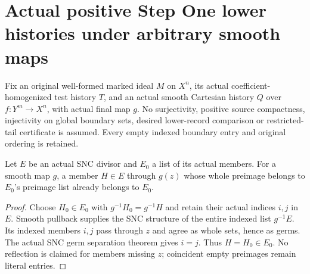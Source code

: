 \section{Actual positive Step One lower histories under arbitrary smooth maps}

Fix an original well-formed marked ideal $M$ on $X^n$, its actual
coefficient-homogenized test history $T$, and an actual smooth Cartesian
history $Q$ over $f:Y^m\to X^n$, with actual final map $g$.
No surjectivity, positive source compactness, injectivity on global boundary
sets, desired lower-record comparison or restricted-tail certificate is
assumed. Every empty indexed boundary entry and original ordering is retained.

\begin{lemma}
\label{hir:smooth-positive-lower-through-member-reflection}
\leanok
{}
Let $E$ be an actual SNC divisor and $E_0$ a list of its actual members.
For a smooth map $g$, a member $H\in E$ through $g(z)$ whose whole preimage
belongs to $E_0$'s preimage list already belongs to $E_0$.
\end{lemma}
\begin{proof}
Choose $H_0\in E_0$ with $g^{-1}H_0=g^{-1}H$ and retain their actual
indices $i,j$ in $E$. Smooth pullback supplies the SNC structure of the
entire indexed list $g^{-1}E$. Its indexed members $i,j$ pass through $z$
and agree as whole sets, hence as germs. The actual SNC germ separation
theorem gives $i=j$. Thus $H=H_0\in E_0$. No reflection is claimed for
members missing $z$; coincident empty preimages remain literal entries.
\end{proof}

